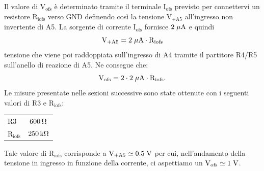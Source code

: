 Il valore di $\mathrm{V_{ofs}}$ è determinato tramite il terminale $\mathrm{I_{ofs}}$ previsto per connettervi un resistore $\mathrm{R_{iofs}}$ verso $\mathrm{GND}$ definendo cos\`i la tensione $\mathrm{V_{+A5}}$ all'ingresso non invertente di A5. La sorgente di corrente $\mathrm{I_{ofs}}$ fornisce $2\; \mu \rm A$ e quindi
\begin{equation}
\label{eq:V+a5}
\mathrm{V_{+A5} = 2 \; \mu \rm A \cdot R_{iofs}}
\end{equation}
tensione che viene poi raddoppiata sull'ingresso di A4 tramite il partitore R4/R5 sull'anello di reazione di A5. Ne consegue che:
\begin{equation}
\label{eq:Vofs}
\mathrm{V_{ofs} = 2\cdot 2\; \mu \rm A \cdot R_{iofs}}.
\end{equation}
Le misure presentate nelle sezioni successive sono state ottenute con i seguenti valori di R3 e $\mathrm{R_{iofs}}$:
\begin{center}
\begin{tabular}{lc}
\hline
$\mathrm{R3}$ & $600{\rm \, \Omega}$ \\%
$\mathrm{R_{iofs}}$ & $250{\rm \, k\Omega}$\\ 
\hline
\end{tabular}
\end{center}
Tale valore di $\mathrm{R_{iofs}}$ corrisponde a $\mathrm{V_{+A5}\simeq0.5\rm \; V}$ per cui, nell'andamento della tensione in ingresso in funzione della corrente, ci aspettiamo un $\mathrm{V_{ofs}\simeq 1\rm \; V}$.

